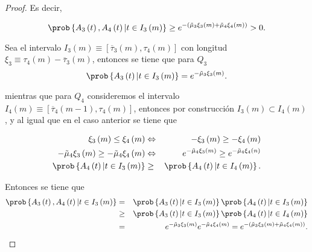 \begin{proof}
Es decir, 

\begin{equation}
\prob\left\{A_{3}\left(t\right),A_{4}\left(t\right)|t\in I_{3}\left(m\right)\right\}\geq
e^{-\left(\tilde{\mu}_{3}\xi_{3}\left(m\right)+\tilde{\mu}_{4}\xi_{4}\left(m\right)\right)}>0.
\end{equation}


Sea el intervalo $I_{3}\left(m\right)\equiv\left[\overline{\tau}_{3}\left(m\right),\tau_{4}\left(m\right)\right]$ con longitud $\xi_{3}\equiv\tau_{4}\left(m\right)-\overline{\tau}_{3}\left(m\right)$, entonces se tiene que para $Q_{3}$
\begin{equation}
\prob\left\{A_{3}\left(t\right)|t\in I_{3}\left(m\right)\right\}=e^{-\tilde{\mu}_{3}\xi_{3}\left(m\right)}.
\end{equation} 

mientras que para $Q_{4}$ consideremos el intervalo $I_{4}\left(m\right)\equiv\left[\overline{\tau}_{4}\left(m-1\right),\tau_{4}\left(m\right)\right]$, entonces por construcci\'on  $I_{3}\left(m\right)\subset I_{4}\left(m\right)$, y al igual que en el caso anterior se tiene que 

\begin{eqnarray*}
\xi_{3}\left(m\right)\leq\xi_{4}\left(m\right)&\Leftrightarrow& -\xi_{3}\left(m\right)\geq-\xi_{4}\left(m\right)
\\
-\tilde{\mu}_{4}\xi_{3}\left(m\right)\geq-\tilde{\mu}_{4}\xi_{4}\left(m\right)&\Leftrightarrow&
e^{-\tilde{\mu}_{4}\xi_{3}\left(m\right)}\geq e^{-\tilde{\mu}_{4}\xi_{4}\left(n\right)}\\
\prob\left\{A_{4}\left(t\right)|t\in I_{3}\left(m\right)\right\}&\geq&
\prob\left\{A_{4}\left(t\right)|t\in I_{4}\left(m\right)\right\}.
\end{eqnarray*}


Entonces se tiene que
\small{
\begin{eqnarray*}
\prob\left\{A_{3}\left(t\right),A_{4}\left(t\right)|t\in I_{3}\left(m\right)\right\}&=&
\prob\left\{A_{3}\left(t\right)|t\in I_{3}\left(m\right)\right\}
\prob\left\{A_{4}\left(t\right)|t\in I_{3}\left(m\right)\right\}\\
&\geq&
\prob\left\{A_{3}\left(t\right)|t\in I_{3}\left(m\right)\right\}
\prob\left\{A_{4}\left(t\right)|t\in I_{4}\left(m\right)\right\}\\
&=&e^{-\tilde{\mu}_{3}\xi_{3}\left(m\right)}e^{-\tilde{\mu}_{4}\xi_{4}\left(m\right)}
=e^{-\left(\tilde{\mu}_{3}\xi_{3}\left(m\right)+\tilde{\mu}_{4}\xi_{4}\left(m\right)\right)}.
\end{eqnarray*}}


\end{proof}
